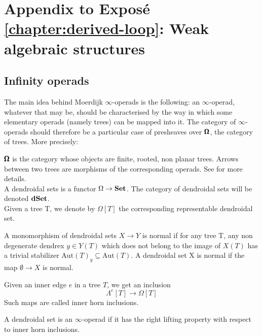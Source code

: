 \chapter*{Appendix to Expos\'e \ref{chapter:derived-loop}: Weak algebraic structures}

\begin{refsection}

\label{weak structures}

\setcounter{section}{0}
\renewcommand{\thesection}{\thechapter.\Alph{section}}
\section{Infinity operads}

The main idea behind Moerdijk $\infty$-operads is the following: an $\infty$-operad, whatever that may be, should be characterised by the way in which some elementary operads (namely trees) can be mapped into it. The category of $\infty$-operads should therefore be a particular case of presheaves over $\pmb{\Omega}$, the category of trees. More precisely:

\begin{definition}
$\pmb{\Omega}$ is the category whose objects are finite, rooted, non planar trees. Arrows between two trees are morphisms of the corresponding operads. See \cite{Mo-We}
for more details.\\
A dendroidal sets is a functor $\Omega\to \mathbf{Set}$. The category of dendroidal sets will be denoted $\mathbf{dSet}$.\\
Given a tree T, we denote by $\Omega[T]$ the corresponding representable dendroidal set.
\end{definition}

\begin{definition}[\cite{Mo-We}]
A monomorphism of dendroidal sets $X\to Y$ is normal if for any tree T, any non degenerate dendrex $y \in Y (T)$ which does not belong to the image of $X(T)$ has a trivial stabilizer $\mathrm{Aut}(T)_y \subseteq \mathrm{Aut}(T)$. A dendroidal set X is normal if the map $\emptyset\to X$ is normal.
\end{definition}

Given an inner edge $e$ in a tree $T$, we get an inclusion
\[
\Lambda^e[T]\to \Omega[T]
\]
Such maps are called inner horn inclusions.

\begin{definition}
A dendroidal set is an $\infty$-operad if it has the right lifting property with respect to inner horn inclusions.
\end{definition}


\end{refsection}
